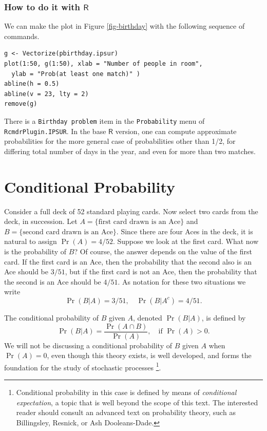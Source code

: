 \documentclass[captions=tableheading]{scrbook}
\begin{document}
\subsubsection{How to do it with \(\mathsf{R}\)}
\label{sec-4-5-2-3}


We can make the plot in Figure \ref{fig-birthday} with the following sequence of commands.


\begin{verbatim}
g <- Vectorize(pbirthday.ipsur)
plot(1:50, g(1:50), xlab = "Number of people in room", 
  ylab = "Prob(at least one match)" )
abline(h = 0.5)
abline(v = 23, lty = 2)
remove(g)
\end{verbatim}

There is a \texttt{Birthday problem} item in the \texttt{Probability} menu of \texttt{RcmdrPlugin.IPSUR}. In the base \(\mathsf{R}\) version, one can compute approximate probabilities for the more general case of probabilities other than 1/2, for differing total number of days in the year, and even for more than two matches.
\section{Conditional Probability}
\label{sec-4-6}
\label{sec-Conditional-Probability}


Consider a full deck of 52 standard playing cards. Now select two cards from the deck, in succession. Let \( A = \{ \mbox{first card drawn is an Ace} \} \) and \( B = \{ \mbox{second card drawn is an Ace} \} \). Since there are four Aces in the deck, it is natural to assign \( \Pr(A) = 4/52 \). Suppose we look at the first card. What now is the probability of \(B\)? Of course, the answer depends on the value of the first card. If the first card is an Ace, then the probability that the second also is an Ace should be \( 3/51 \), but if the first card is not an Ace, then the probability that the second is an Ace should be \( 4/51 \). As notation for these two situations we write
\[
\Pr(B|A)=3/51,\quad\Pr(B|A^{c})=4/51.
\]

\begin{defn}
The conditional probability of \(B\) given \(A\), denoted \(\Pr(B|A)\), is defined by
\begin{equation}
\Pr(B|A)=\frac{\Pr(A\cap B)}{\Pr(A)},\quad\mbox{if }\Pr(A)>0.
\end{equation}
We will not be discussing a conditional probability of \(B\) given \(A\) when \(\Pr(A)=0\), even though this theory exists, is well developed, and forms the foundation for the study of stochastic processes
\footnote{Conditional probability in this case is defined by means of \emph{conditional expectation}, a topic that is well beyond the scope of this text. The interested reader should consult an advanced text on probability theory, such as Billingsley, Resnick, or Ash Dooleans-Dade.}.
\end{defn}
\end{document}
